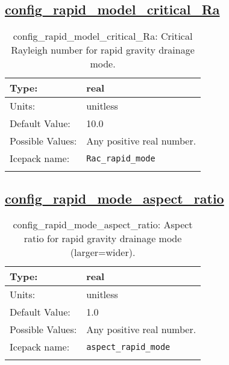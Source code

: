 \subsection[config\_rapid\_model\_critical\_Ra]{\hyperref[sec:nm_tab_thermodynamics]{config\_rapid\_model\_critical\_Ra}}
\label{subsec:nm_sec_config_rapid_model_critical_Ra}
\begin{center}
\begin{longtable}{| p{2.0in} || p{4.0in} |}
    \hline
    Type: & real \\
    \hline
    Units: & \si{unitless} \\
    \hline
    Default Value: & 10.0 \\
    \hline
    Possible Values: & Any positive real number. \\
    \hline
    Icepack name: & \verb+Rac_rapid_mode+ \\
    \hline
    \caption{config\_rapid\_model\_critical\_Ra: Critical Rayleigh number for rapid gravity drainage mode.}
\end{longtable}
\end{center}
\subsection[config\_rapid\_mode\_aspect\_ratio]{\hyperref[sec:nm_tab_thermodynamics]{config\_rapid\_mode\_aspect\_ratio}}
\label{subsec:nm_sec_config_rapid_mode_aspect_ratio}
\begin{center}
\begin{longtable}{| p{2.0in} || p{4.0in} |}
    \hline
    Type: & real \\
    \hline
    Units: & \si{unitless} \\
    \hline
    Default Value: & 1.0 \\
    \hline
    Possible Values: & Any positive real number. \\
    \hline
    Icepack name: & \verb+aspect_rapid_mode+ \\
    \hline
    \caption{config\_rapid\_mode\_aspect\_ratio: Aspect ratio for rapid gravity drainage mode (larger=wider).}
\end{longtable}
\end{center}
